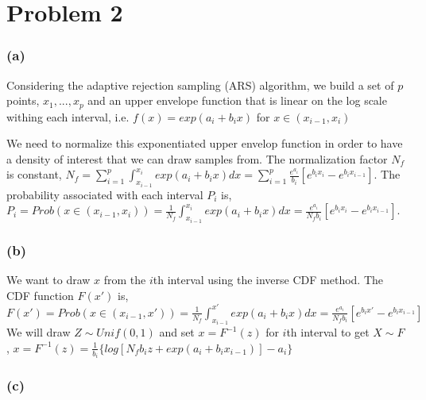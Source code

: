 \documentclass{article}\usepackage{graphicx, color}
\begin{document}
\section*{Problem 2}

\subsubsection*{(a)}

\hspace{12 pt} Considering the adaptive rejection sampling (ARS) algorithm, we build a set of $p$ points,
$x_1,...,x_p$ and an upper envelope function that is linear on the log scale withing each interval, i.e.
$f(x) = exp(a_i+b_ix)$ for $x\in(x_{i-1},x_i)$

We need to normalize this exponentiated upper envelop function in order to have a density of interest that
we can draw samples from.\newline
The normalization factor $N_f$ is constant,\newline
$N_f = \displaystyle\sum_{i=1}^p \int_{x_{i-1}}^{x_i} exp(a_i+b_ix)dx 
     = \displaystyle\sum_{i=1}^p \frac{e^{a_i}}{b_i}[e^{b_ix_i}-e^{b_ix_{i-1}}]$.\newline
The probability associated with each interval $P_i$ is, \newline
$P_i = Prob(x\in(x_{i-1},x_i)) = \frac{1}{N_f}\displaystyle\int_{x_{i-1}}^{x_i}exp(a_i+b_ix)dx
     = \frac{e^{a_i}}{N_fb_i}[e^{b_ix_i}-e^{b_ix_{i-1}}]$.\newline


\subsubsection*{(b)}

\hspace{12 pt} We want to draw $x$ from the $i$th interval using the inverse CDF method.\newline
The CDF function $F(x')$ is,\newline
$F(x') = Prob(x\in(x_{i-1},x')) = \frac{1}{N_f}\displaystyle\int_{x_{i-1}}^{x'}exp(a_i+b_ix)dx
        = \frac{e^{a_i}}{N_fb_i}[e^{b_ix'}-e^{b_ix_{i-1}}]$\newline
We will draw $Z\sim Unif(0,1)$ and set $x = F^{-1}(z)$ for $i$th interval to get $X\sim F$,\newline
$x = F^{-1}(z) = \frac{1}{b_i} \{\displaystyle log[N_fb_iz + exp(a_i+b_ix_{i-1})] -a_i\}$

\subsubsection*{(c)}
\end{document}
